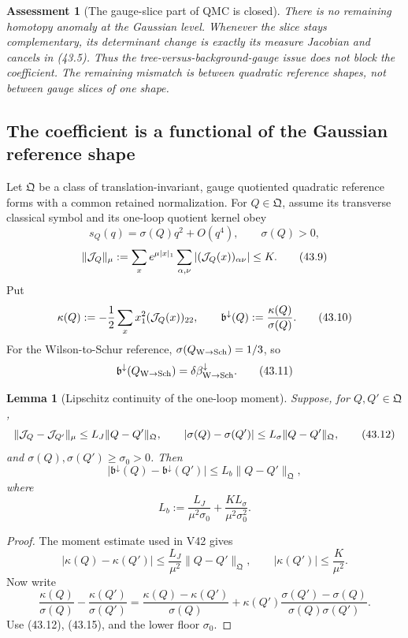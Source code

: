 \documentclass[11pt,oneside]{book}
\newtheorem{lemma}[theorem]{Lemma}
\newtheorem{assessment}[theorem]{Assessment}
\theoremstyle{definition}
\theoremstyle{remark}
\begin{document}
\begin{assessment}[The gauge-slice part of QMC is closed]
\label{ass:e8v43-slice-closed}
There is no remaining homotopy anomaly at the Gaussian level.
Whenever the slice stays complementary, its determinant change is
exactly its measure Jacobian and cancels in (43.5).  Thus the
tree-versus-background-gauge issue does not block the coefficient.
The remaining mismatch is between quadratic \emph{reference shapes},
not between gauge slices of one shape.
\end{assessment}

\subsection{The coefficient is a functional of the Gaussian reference shape}

Let \(\mathfrak Q\) be a class of translation-invariant, gauge
quotiented quadratic reference forms with a common retained
normalization.  For \(Q\in\mathfrak Q\), assume its transverse
classical symbol and its one-loop quotient kernel obey
\[
 s_Q(q)=\sigma(Q)q^2+O(q^4),\qquad \sigma(Q)>0,                 \tag{43.8}
\]
\[
 \|{\cal J}_Q\|_\mu
 :=\sum_xe^{\mu|x|_1}\sum_{\alpha,\nu}
 |({\cal J}_Q(x))_{\alpha\nu}|\le K.                           \tag{43.9}
\]
Put
\[
 \kappa(Q):=-\frac12\sum_xx_1^2({\cal J}_Q(x))_{22},
 \qquad
 \mathfrak b^\downarrow(Q):=\frac{\kappa(Q)}{\sigma(Q)}.        \tag{43.10}
\]
For the Wilson-to-Schur reference,
\(\sigma(Q_{\rm W\to Sch})=1/3\), so
\[
 \mathfrak b^\downarrow(Q_{\rm W\to Sch})
 =\delta\beta_{\rm W\to Sch}^{\downarrow}.                     \tag{43.11}
\]

\begin{lemma}[Lipschitz continuity of the one-loop moment]
\label{lem:e8v43-moment-Lipschitz}
Suppose, for \(Q,Q'\in\mathfrak Q\),
\[
 \|{\cal J}_Q-{\cal J}_{Q'}\|_\mu
 \le L_J\|Q-Q'\|_{\mathfrak Q},\qquad
 |\sigma(Q)-\sigma(Q')|
 \le L_\sigma\|Q-Q'\|_{\mathfrak Q},                           \tag{43.12}
\]
and \(\sigma(Q),\sigma(Q')\ge\sigma_0>0\).  Then
\[
 \boxed{
 |\mathfrak b^\downarrow(Q)-\mathfrak b^\downarrow(Q')|
 \le L_b\|Q-Q'\|_{\mathfrak Q},}                               \tag{43.13}
\]
where
\[
 L_b:=\frac{L_J}{\mu^2\sigma_0}
      +\frac{KL_\sigma}{\mu^2\sigma_0^2}.                       \tag{43.14}
\]
\end{lemma}

\begin{proof}
The moment estimate used in V42 gives
\[
 |\kappa(Q)-\kappa(Q')|
 \le\frac{L_J}{\mu^2}\|Q-Q'\|_{\mathfrak Q},
 \qquad |\kappa(Q')|\le\frac K{\mu^2}.                          \tag{43.15}
\]
Now write
\[
 \frac{\kappa(Q)}{\sigma(Q)}
 -\frac{\kappa(Q')}{\sigma(Q')}
 =
 \frac{\kappa(Q)-\kappa(Q')}{\sigma(Q)}
 +\kappa(Q')
 \frac{\sigma(Q')-\sigma(Q)}{\sigma(Q)\sigma(Q')}.
\]
Use (43.12), (43.15), and the lower floor \(\sigma_0\).
\end{proof}
\end{document}
